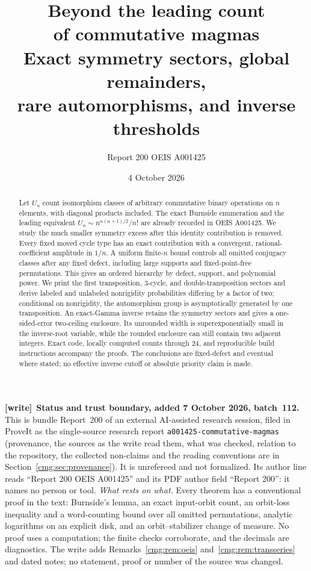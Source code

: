 \documentclass[11pt,letterpaper]{article}
\title{\LARGE\bfseries Beyond the leading count\\of commutative magmas\\[9pt]\large Exact symmetry sectors, global remainders,\\rare automorphisms, and inverse thresholds}
\author{Report 200 \quad\textbullet\quad OEIS A001425}
\date{4 October 2026}
\numberwithin{equation}{section}
\theoremstyle{definition}\newtheorem{definition}[theorem]{Definition}
\theoremstyle{remark}\newtheorem{remark}[theorem]{Remark}
\newcommand{\file}[1]{\nolinkurl{#1}}
\newenvironment{writenote}[1][]{\par\smallskip\begingroup\small
 \noindent\textbf{[write]}\if\relax\detokenize{#1}\relax\else~\textbf{#1.}\fi\ }%
 {\par\endgroup\smallskip}
\begin{document}
\maketitle
\begin{abstract}
Let $U_n$ count isomorphism classes of arbitrary commutative binary operations on $n$ elements, with diagonal products included. The exact Burnside enumeration and the leading equivalent $U_n\sim n^{n(n+1)/2}/n!$ are already recorded in OEIS A001425. We study the much smaller symmetry excess after this identity contribution is removed. Every fixed moved cycle type has an exact contribution with a convergent, rational-coefficient amplitude in $1/n$. A uniform finite-$n$ bound controls all omitted conjugacy classes after any fixed defect, including large supports and fixed-point-free permutations. This gives an ordered hierarchy by defect, support, and polynomial power. We print the first transposition, $3$-cycle, and double-transposition sectors and derive labeled and unlabeled nonrigidity probabilities differing by a factor of two; conditional on nonrigidity, the automorphism group is asymptotically generated by one transposition. An exact-Gamma inverse retains the symmetry sectors and gives a one-sided-error two-ceiling enclosure. Its unrounded width is superexponentially small in the inverse-root variable, while the rounded enclosure can still contain two adjacent integers. Exact code, locally computed counts through $24$, and reproducible build instructions accompany the proofs. The conclusions are fixed-defect and eventual where stated; no effective inverse cutoff or absolute priority claim is made.
\end{abstract}
\begin{writenote}[Status and trust boundary, added 7 October 2026, batch~112]
This is bundle Report~200 of an external AI-assisted research session, filed
in ProveIt as the single-source research report
\file{a001425-commutative-magmas} (provenance, the sources as the write read
them, what was checked, relation to the repository, the collected non-claims
and the reading conventions are in Section~\ref{cmg:sec:provenance}). It is
unrefereed and not formalized. Its author line reads ``Report 200 \textbullet{}
OEIS A001425'' and its PDF author field ``Report 200'': it names no person or
tool. \emph{What rests on what.} Every theorem has a conventional proof in the
text: Burnside's lemma, an exact input-orbit count, an orbit-loss inequality
and a word-counting bound over all omitted permutations, analytic logarithms on
an explicit disk, and an orbit--stabilizer change of measure. No proof uses a
computation; the finite checks corroborate, and the decimals are diagnostics.
The write adds Remarks~\ref{cmg:rem:oeis} and~\ref{cmg:rem:transseries} and
dated notes; no statement, proof or number of the source was changed.
\end{writenote}
\end{document}
